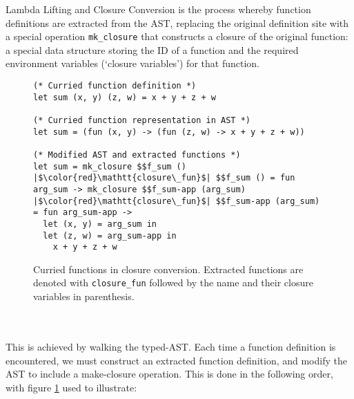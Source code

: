 Lambda Lifting and Closure Conversion is the process whereby function definitions are extracted from the AST, replacing the original definition site with a special operation \texttt{mk\_closure} that constructs a closure of the original function: a special data structure storing the ID of a function and the required environment variables (`closure variables') for that function.
\begin{figure}[h]
\begin{verbatim}
(* Curried function definition *)
let sum (x, y) (z, w) = x + y + z + w

(* Curried function representation in AST *)
let sum = (fun (x, y) -> (fun (z, w) -> x + y + z + w))

(* Modified AST and extracted functions *)
let sum = mk_closure $$f_sum ()
|$\color{red}\mathtt{closure\_fun}$| $$f_sum () = fun arg_sum -> mk_closure $$f_sum-app (arg_sum)
|$\color{red}\mathtt{closure\_fun}$| $$f_sum-app (arg_sum) = fun arg_sum-app ->
  let (x, y) = arg_sum in
  let (z, w) = arg_sum-app in
    x + y + z + w
\end{verbatim}
\caption{Curried functions in closure conversion. Extracted functions are denoted with {\color{red}\texttt{closure\_fun}} followed by the name and their closure variables in parenthesis.}
\label{fig:curried}
\end{figure}
\\\\
This is achieved by walking the typed-AST. Each time a function definition is encountered, we must construct an extracted function definition, and modify the AST to include a make-closure operation. This is done in the following order, with figure \ref{fig:curried} used to illustrate:
